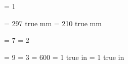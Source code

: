 

\pdfoutput           = 1

\pdfpageheight       = 297 true mm
\pdfpagewidth        = 210 true mm

\pdfminorversion     = 7
\pdfobjcompresslevel = 2

\pdfcompresslevel    = 9
\pdfdecimaldigits    = 3
\pdfpkresolution     = 600
\pdfhorigin          = 1 true in
\pdfvorigin          = 1 true in
